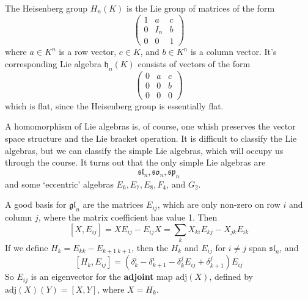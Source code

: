 \begin{example}
    The Heisenberg group $H_n(K)$ is the Lie group of matrices of the form
    \[ \begin{pmatrix} 1 & a & c \\ 0 & I_n & b \\ 0 & 0 & 1 \end{pmatrix} \]
    where $a \in K^n$ is a row vector, $c \in K$, and $b \in K^n$ is a column vector. It's corresponding Lie algebra $\mathfrak{h}_n(K)$ consists of vectors of the form
    \[ \begin{pmatrix} 0 & a & c \\ 0 & 0 & b \\ 0 & 0 & 0 \end{pmatrix} \]
    which is flat, since the Heisenberg group is essentially flat.
\end{example}

A homomorphism of Lie algebras is, of course, one whish preserves the vector space structure and the Lie bracket operation. It is difficult to classify the Lie algebras, but we can classify the simple Lie algebras, which will occupy us through the course. It turns out that the only simple Lie algebras are
%
\[ \mathfrak{sl}_n, \mathfrak{so}_n, \mathfrak{sp}_n \]
%
and some `eccentric' algebras $E_6, E_7, E_8, F_4$, and $G_2$.

A good basis for $\mathfrak{gl}_n$ are the matrices $E_{ij}$, which are only non-zero on row $i$ and column $j$, where the matrix coefficient has value 1. Then
%
\[ [X, E_{ij}] = XE_{ij} - E_{ij}X = \sum_k X_{ki} E_{kj} - X_{jk} E_{ik} \]
%
If we define $H_k = E_{kk} - E_{k+1\ k+1}$, then the $H_k$ and $E_{ij}$ for $i \neq j$ span $\mathfrak{sl}_n$, and
%
\[ [H_k, E_{ij}] = (\delta_k^i - \delta_{k+1}^i - \delta_k^j E_{ij} + \delta_{k+1}^j) E_{ij} \]
%
So $E_{ij}$ is an eigenvector for the {\bf adjoint} map $\text{adj}(X)$, defined by $\text{adj}(X)(Y) = [X,Y]$, where $X = H_k$.

